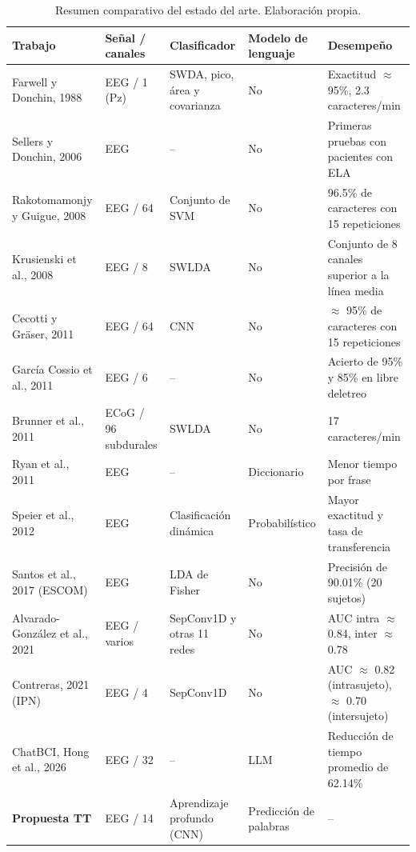 \begin{table}[htbp]
\centering
\footnotesize
\begin{tabularx}{\textwidth}{|L{3.1cm}|L{1.8cm}|L{2.4cm}|L{2.1cm}|Y|}
\hline
\textbf{Trabajo} & \textbf{Señal / canales} & \textbf{Clasificador} & \textbf{Modelo de lenguaje} & \textbf{Desempeño} \\ \hline
Farwell y Donchin, 1988 \cite{farwell1988} & EEG / 1 (Pz) & SWDA, pico, área y covarianza & No & Exactitud $\approx$ 95\%, 2.3 caracteres/min \\ \hline
Sellers y Donchin, 2006 \cite{sellers2006} & EEG & -- & No & Primeras pruebas con pacientes con ELA \\ \hline
Rakotomamonjy y Guigue, 2008 \cite{rakotomamonjy2008} & EEG / 64 & Conjunto de SVM & No & 96.5\% de caracteres con 15 repeticiones \\ \hline
Krusienski et al., 2008 \cite{krusienski2008} & EEG / 8 & SWLDA & No & Conjunto de 8 canales superior a la línea media \\ \hline
Cecotti y Gräser, 2011 \cite{cecotti2011} & EEG / 64 & CNN & No & $\approx$ 95\% de caracteres con 15 repeticiones \\ \hline
García Cossio et al., 2011 \cite{garciacossio2011} & EEG / 6 & -- & No & Acierto de 95\% y 85\% en libre deletreo \\ \hline
Brunner et al., 2011 \cite{brunner2011} & ECoG / 96 subdurales & SWLDA & No & 17 caracteres/min \\ \hline
Ryan et al., 2011 \cite{ryan2011} & EEG & -- & Diccionario & Menor tiempo por frase \\ \hline
Speier et al., 2012 \cite{speier2012} & EEG & Clasificación dinámica & Probabilístico & Mayor exactitud y tasa de transferencia \\ \hline
Santos et al., 2017 (ESCOM) \cite{santos2017} & EEG & LDA de Fisher & No & Precisión de 90.01\% (20 sujetos) \\ \hline
Alvarado-González et al., 2021 \cite{alvarado2021} & EEG / varios & SepConv1D y otras 11 redes & No & AUC intra $\approx$ 0.84, inter $\approx$ 0.78 \\ \hline
Contreras, 2021 (IPN) \cite{contreras2021} & EEG / 4 & SepConv1D & No & AUC $\approx$ 0.82 (intrasujeto), $\approx$ 0.70 (intersujeto) \\ \hline
ChatBCI, Hong et al., 2026 \cite{hong2026} & EEG / 32 & -- & LLM & Reducción de tiempo promedio de 62.14\% \\ \hline
\textbf{Propuesta TT} & EEG / 14 & Aprendizaje profundo (CNN) & Predicción de palabras & -- \\ \hline
\end{tabularx}
\caption{Resumen comparativo del estado del arte. Elaboración propia.}
\label{tab:estado-arte}
\end{table}
